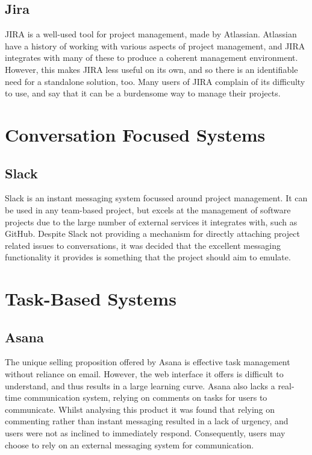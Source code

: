 \documentclass[a4paper]{l3proj}
\begin{document}
\subsection{Jira}
\label{jira}
JIRA \cite{site:jira1} is a well-used tool for project management, made by Atlassian. Atlassian have a history of working with various aspects of project management, and JIRA integrates with many of these to produce a coherent management environment. However, this makes JIRA less useful on its own, and so there is an identifiable need for a standalone solution, too. Many users of JIRA complain of its difficulty to use, and say that it can be a burdensome way to manage their projects.

\section{Conversation Focused Systems}

\subsection{Slack}
\label{slack}
Slack \cite{site:slack} is an instant messaging system focussed around project management. It can be used in any team-based project, but excels at the management of software projects due to the large number of external services it integrates with, such as GitHub. Despite Slack not providing a mechanism for directly attaching project related issues to conversations, it was decided that the excellent messaging functionality it provides is something that the project should aim to emulate.


\section{Task-Based Systems}
\subsection{Asana}
\label{asana}

The unique selling proposition offered by Asana \cite{site:asana} is effective task management without reliance on email. However, the web interface it offers is difficult to understand, and thus results in a large learning curve. Asana also lacks a real-time communication system, relying on comments on tasks for users to communicate. Whilst analysing this product it was found that relying on commenting rather than instant messaging resulted in a lack of urgency, and users were not as inclined to immediately respond. Consequently, users may choose to rely on an external messaging system for communication.
\end{document}
